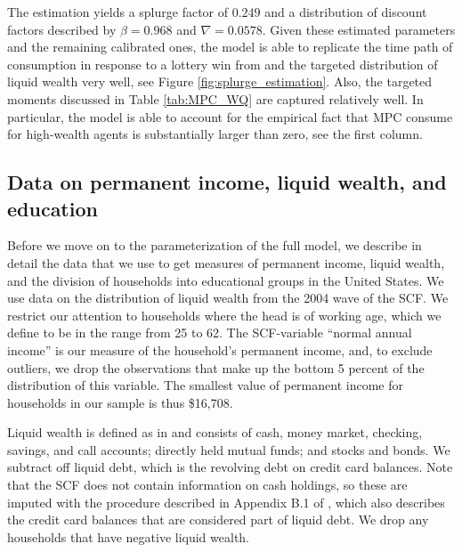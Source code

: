 \documentclass[\econtexRoot/HAFiscal]{subfiles}
\begin{document}
The estimation yields a splurge factor of $0.249$ and a distribution of discount factors described by $\beta = 0.968$ and $\nabla=0.0578$. Given these estimated parameters and the remaining calibrated ones, the model is able to replicate the time path of consumption in response to a lottery win from \citet{fagereng_mpc_2021} and the targeted distribution of liquid wealth very well, see Figure \ref{fig:splurge_estimation}. Also, the targeted moments discussed in Table \ref{tab:MPC_WQ} are captured relatively well. In particular, the model is able to account for the empirical fact that MPC consume for high-wealth agents is substantially larger than zero, see the first column. 



 

\hypertarget{data-on-permanent-income-liquid-wealth-and-education}{}\par\subsection{Data on permanent income, liquid wealth, and education}
\notinsubfile{\label{sec:SCFdata}}

Before we move on to the parameterization of the full model, we describe in detail the data that we use to get measures of permanent income, liquid wealth, and the division of households into educational groups in the United States. We use data on the distribution of liquid wealth from the 2004 wave of the SCF. We restrict our attention to households where the head is of working age, which we define to be in the range from 25 to 62. The SCF-variable ``normal annual income'' is our measure of the household's permanent income, and, to exclude outliers, we drop the observations that make up the bottom 5 percent of the distribution of this variable. The smallest value of permanent income for households in our sample is thus \$16,708. 

Liquid wealth is defined as in \cite{kaplan2014model} and consists of cash, money market, checking, savings, and call accounts; directly held mutual funds; and stocks and bonds. We subtract off liquid debt, which is the revolving debt on credit card balances. Note that the SCF does not contain information on cash holdings, so these are imputed with the procedure described in Appendix B.1 of \cite{kaplan2014model}, which also describes the credit card balances that are considered part of liquid debt. We drop any households that have negative liquid wealth. 
\end{document}
